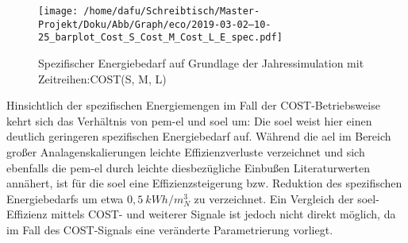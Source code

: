 \documentclass[onecolumn,10pt,titlepage]{article}
\begin{document}
%
%
%

\begin{figure}[H]
	
	\centering
	\texttt{[image: /home/dafu/Schreibtisch/Master-Projekt/Doku/Abb/Graph/eco/2019-03-02--10-25\_barplot\_Cost\_S\_Cost\_M\_Cost\_L\_E\_spec.pdf]}
	\caption[Spezifischer Energiebedarf -COST]{Spezifischer Energiebedarf auf Grundlage der Jahressimulation mit Zeitreihen:COST(S, M, L) }
	\label{fig:analy_COST_Espec} 
\end{figure}

Hinsichtlich der spezifischen Energiemengen im Fall der COST-Betriebsweise kehrt sich das Verhältnis von \gls{pem}-\gls{el} und \gls{soel} um: Die \gls{soel} weist hier einen deutlich geringeren spezifischen Energiebedarf auf. Während die \gls{ael} im Bereich großer Analagenskalierungen leichte Effizienzverluste verzeichnet und sich ebenfalls die \gls{pem}-\gls{el} durch leichte diesbezügliche Einbußen Literaturwerten annähert, ist für die \gls{soel} eine Effizienzsteigerung bzw. Reduktion des spezifischen Energiebedarfs um etwa $0,5~kWh/m^3_N$ zu verzeichnet. Ein Vergleich der \gls{soel}-Effizienz mittels COST- und weiterer Signale ist jedoch nicht direkt möglich, da im Fall des COST-Signals eine veränderte Parametrierung vorliegt. %
\end{document}

